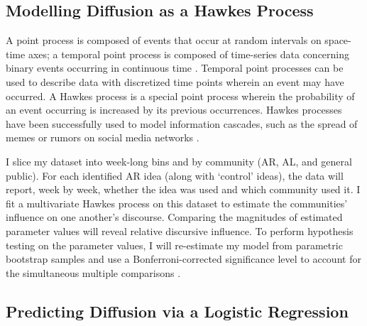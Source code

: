 \documentclass[acmlarge, screen, authorversion]{acmart}
\begin{document}
\subsection{Modelling Diffusion as a Hawkes Process}

A point process is composed of events that occur at random intervals on
space-time axes; a temporal point process is composed of time-series data
concerning binary events occurring in continuous time
\cite{daleyIntroductionTheoryPoint2003, ogataSpaceTimePointProcessModels1998}.
Temporal point processes can be used to describe data with discretized time
points wherein an event may have occurred. A Hawkes process is a special point
process wherein the probability of an event occurring is increased by its
previous occurrences. Hawkes processes have been successfully used to model
information cascades, such as the spread of memes or rumors on social media
networks
\cite{luoMultiTaskMultiDimensionalHawkes2015,lukasikHawkesProcessesContinuous2016}.

I slice my dataset into week-long bins and by community (AR, AL, and general
public). For each identified AR idea (along with  `control' ideas), the data
will report, week by week, whether the idea was used and which community used
it. I fit a multivariate Hawkes process on this dataset to estimate the
communities' influence on one another's discourse. Comparing the magnitudes of
estimated parameter values will reveal relative discursive influence. To perform
hypothesis testing on the parameter values, I will re-estimate my model from
parametric bootstrap samples \cite{reinhartReviewSelfExcitingSpatioTemporal2018}
and use a Bonferroni-corrected significance level to account for the
simultaneous multiple comparisons \cite{tanEffectWordingMessage2014}.

%

\subsection{Predicting Diffusion via a Logistic Regression}
\end{document}
